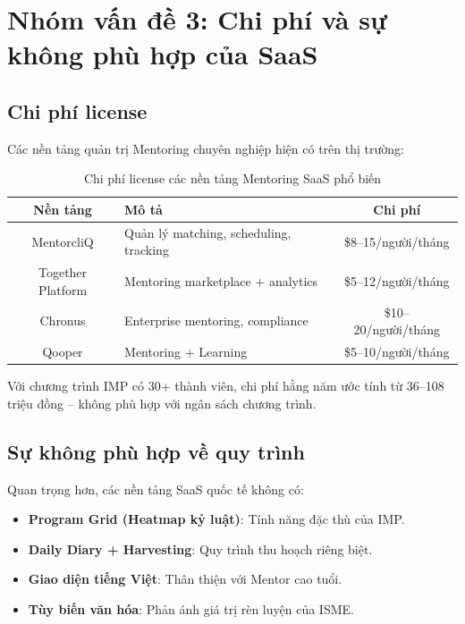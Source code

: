 \section{Nhóm vấn đề 3: Chi phí và sự không phù hợp của SaaS}

\subsection{Chi phí license}
Các nền tảng quản trị Mentoring chuyên nghiệp hiện có trên thị trường:

\begin{table}[H]
  \centering
  \begin{tabularx}{\textwidth}{|c|L|c|}
    \hline
     \textbf{\color{white} Nền tảng} & \textbf{\color{white} Mô tả} & \textbf{\color{white} Chi phí} \\ \hline
    MentorcliQ & Quản lý matching, scheduling, tracking & \$8--15/người/tháng \\ \hline
    Together Platform & Mentoring marketplace + analytics & \$5--12/người/tháng \\ \hline
    Chronus & Enterprise mentoring, compliance & \$10--20/người/tháng \\ \hline
    Qooper & Mentoring + Learning & \$5--10/người/tháng \\ \hline
  \end{tabularx}
  \caption{Chi phí license các nền tảng Mentoring SaaS phổ biến}
\end{table}

Với chương trình IMP có 30+ thành viên, chi phí hằng năm ước tính từ 36--108 triệu đồng -- không phù hợp với ngân sách chương trình.

\subsection{Sự không phù hợp về quy trình}
Quan trọng hơn, các nền tảng SaaS quốc tế không có:
\begin{itemize}
  \item \textbf{Program Grid (Heatmap kỷ luật)}: Tính năng đặc thù của IMP.
  \item \textbf{Daily Diary + Harvesting}: Quy trình thu hoạch riêng biệt.
  \item \textbf{Giao diện tiếng Việt}: Thân thiện với Mentor cao tuổi.
  \item \textbf{Tùy biến văn hóa}: Phản ánh giá trị rèn luyện của ISME.
\end{itemize}

